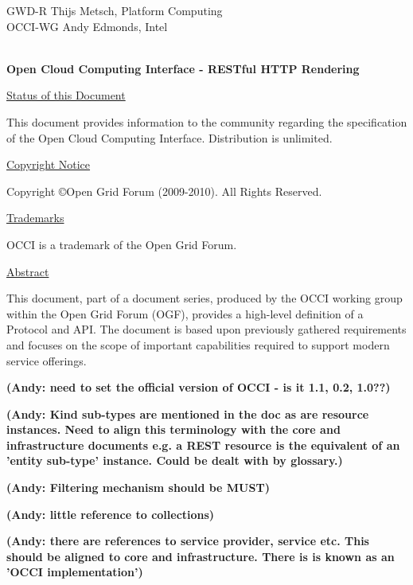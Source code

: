 \documentclass[10pt,a4paper]{article}
\begin{document}
\thispagestyle{empty}

GWD-R \hfill Thijs Metsch, Platform Computing\\
OCCI-WG \hfill Andy Edmonds, Intel\\
\\

\vspace*{0.5in}

\begin{Large}
\textbf{Open Cloud Computing Interface - RESTful HTTP Rendering}
\end{Large}

\vspace*{0.5in}

\underline{Status of this Document}

This document provides information to the community regarding the
specification of the Open Cloud Computing Interface. Distribution is
unlimited.

\underline{Copyright Notice}

Copyright \copyright Open Grid Forum (2009-2010). All Rights Reserved.

\underline{Trademarks}

OCCI is a trademark of the Open Grid Forum.

\underline{Abstract}

This document, part of a document series, produced by the OCCI working
group within the Open Grid Forum (OGF), provides a high-level
definition of a Protocol and API. The document is based upon
previously gathered requirements and focuses on the scope of important
capabilities required to support modern service offerings.

\textbf{(Andy: need to set the official version of OCCI - is it 1.1, 0.2, 1.0??)}

\textbf{(Andy: Kind sub-types are mentioned in the doc as are resource instances. Need to align this terminology with the core and infrastructure documents e.g. a REST resource is the equivalent of an 'entity sub-type' instance. Could be dealt with by glossary.)}

\textbf{(Andy: Filtering mechanism should be MUST)}

\textbf{(Andy: little reference to collections)}

\textbf{(Andy: there are references to service provider, service etc. This should be aligned to core and infrastructure. There is is known as an 'OCCI implementation')}
\end{document}
